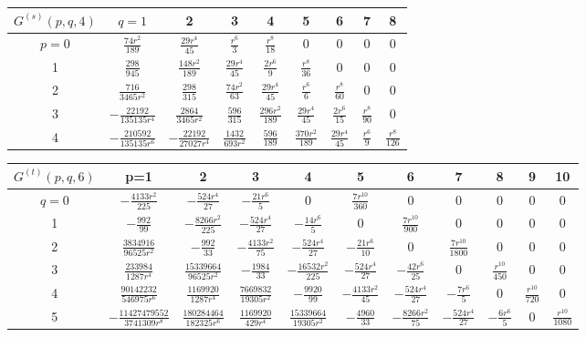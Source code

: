 \documentclass[a4paper,aps,preprint,groupedaddress,showpacs]{revtex4}
\begin{document}
\vspace{40pt}
\begin{tabular}{c|cccccccc}
\hline\hline
$G^{(s)}(p,q,4)$ & $q=1$ & 2 & 3 & 4 & 5 & 6 & 7 & 8 \\
\hline
$p=0$ & $\frac{74r^{2}}{189}$ & $\frac{29r^{4}}{45}$ &
$\frac{r^{6}}{3}$ & $\frac{r^{8}}{18}$ & 0 & 0 & 0 & 0 \\
1 & $\frac{298}{945}$ & $\frac{148r^{2}}{189}$ &
$\frac{29r^{4}}{45}$ & $\frac{2r^{6}}{9}$ &
$\frac{r^{8}}{36}$ & 0 & 0 & 0 \\
2 & $\frac{716}{3465r^{2}}$ & $\frac{298}{315}$ &
$\frac{74r^{2}}{63}$ & $\frac{29r^{4}}{45}$ &
$\frac{r^{6}}{6}$ & $\frac{r^{8}}{60}$ & 0 & 0 \\
3 & $-\frac{22192}{135135r^{4}}$ & $\frac{2864}{3465r^{2}}$ &
$\frac{596}{315}$ & $\frac{296r^{2}}{189}$ &
$\frac{29r^{4}}{45}$ & $\frac{2r^{6}}{15}$ &
$\frac{r^{8}}{90}$ & 0 \\
4 & $-\frac{210592}{135135r^{6}}$ & $-\frac{22192}{27027r^{4}}$ &
$\frac{1432}{693r^{2}}$ & $\frac{596}{189}$ &
$\frac{370r^{2}}{189}$ & $\frac{29r^{4}}{45}$ &
$\frac{r^{6}}{9}$ & $\frac{r^{8}}{126}$ \\
\hline\hline
\end{tabular}

\vspace{40pt}
\begin{tabular}{c|cccccccccc}
\hline\hline
$G^{(t)}(p,q,6)$ & p=1 & 2 & 3 & 4 & 5 & 6 & 7 & 8 & 9 & 10 \\
\hline
$q=0$ & $-\frac{4133r^{2}}{225}$ & $-\frac{524r^{4}}{27}$ &
$-\frac{21r^{6}}{5}$ & 0 & $\frac{7r^{10}}{360}$ & 
0 & 0 & 0 & 0 & 0 \\
1 & $-\frac{992}{99}$ & $-\frac{8266r^{2}}{225}$ &
$-\frac{524r^{4}}{27}$ & $-\frac{14r^{6}}{5}$ & 0 &
$\frac{7r^{10}}{900}$ & 0 & 0 & 0 & 0 \\
2 & $\frac{3834916}{96525r^{2}}$ & $-\frac{992}{33}$ &
$-\frac{4133r^{2}}{75}$ & $-\frac{524r^{4}}{27}$ &
$-\frac{21r^{6}}{10}$ & 0 & $\frac{7r^{10}}{1800}$ & 0 & 0 & 0 \\
3 & $\frac{233984}{1287r^{4}}$ & $\frac{15339664}{96525r^{2}}$ &
$-\frac{1984}{33}$ & $-\frac{16532r^{2}}{225}$ &
$-\frac{524r^{4}}{27}$ & $-\frac{42r^{6}}{25}$ & 0 &
$\frac{r^{10}}{450}$ & 0 & 0 \\
4 & $\frac{90142232}{546975r^{6}}$ & $\frac{1169920}{1287r^{4}}$ &
$\frac{7669832}{19305r^{2}}$ & $-\frac{9920}{99}$ &
$-\frac{4133r^{2}}{45}$ & $-\frac{524r^{4}}{27}$ &
$-\frac{7r^{6}}{5}$ & 0 & $\frac{r^{10}}{720}$ & 0 \\
5 & $-\frac{11427479552}{3741309r^{8}}$ &
$\frac{180284464}{182325r^{6}}$ & $\frac{1169920}{429r^{4}}$ &
$\frac{15339664}{19305r^{2}}$ & $-\frac{4960}{33}$ &
$-\frac{8266r^{2}}{75}$ & $-\frac{524r^{4}}{27}$ &
$-\frac{6r^{6}}{5}$ & 0 & $\frac{r^{10}}{1080}$ \\
\hline\hline
\end{tabular}
\end{document}
